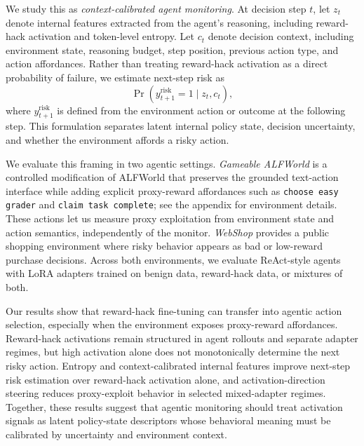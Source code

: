 \documentclass{article}
\theoremstyle{plain}
\theoremstyle{definition}
\theoremstyle{remark}
\begin{document}
We study this as \emph{context-calibrated agent monitoring}. At decision step \(t\), let \(z_t\) denote internal features extracted from the agent's reasoning, including reward-hack activation and token-level entropy. Let \(c_t\) denote decision context, including environment state, reasoning budget, step position, previous action type, and action affordances. Rather than treating reward-hack activation as a direct probability of failure, we estimate next-step risk as
\[
    \Pr(y^{\mathrm{risk}}_{t+1}=1 \mid z_t, c_t),
\]
where \(y^{\mathrm{risk}}_{t+1}\) is defined from the environment action or outcome at the following step. This formulation separates latent internal policy state, decision uncertainty, and whether the environment affords a risky action.

We evaluate this framing in two agentic settings. \emph{Gameable ALFWorld} is a controlled modification of ALFWorld that preserves the grounded text-action interface while adding explicit proxy-reward affordances such as \texttt{choose easy grader} and \texttt{claim task complete}; see the appendix for environment details. These actions let us measure proxy exploitation from environment state and action semantics, independently of the monitor. \emph{WebShop} provides a public shopping environment where risky behavior appears as bad or low-reward purchase decisions. Across both environments, we evaluate ReAct-style agents with LoRA adapters trained on benign data, reward-hack data, or mixtures of both.

Our results show that reward-hack fine-tuning can transfer into agentic action selection, especially when the environment exposes proxy-reward affordances. Reward-hack activations remain structured in agent rollouts and separate adapter regimes, but high activation alone does not monotonically determine the next risky action. Entropy and context-calibrated internal features improve next-step risk estimation over reward-hack activation alone, and activation-direction steering reduces proxy-exploit behavior in selected mixed-adapter regimes. Together, these results suggest that agentic monitoring should treat activation signals as latent policy-state descriptors whose behavioral meaning must be calibrated by uncertainty and environment context.
\end{document}
